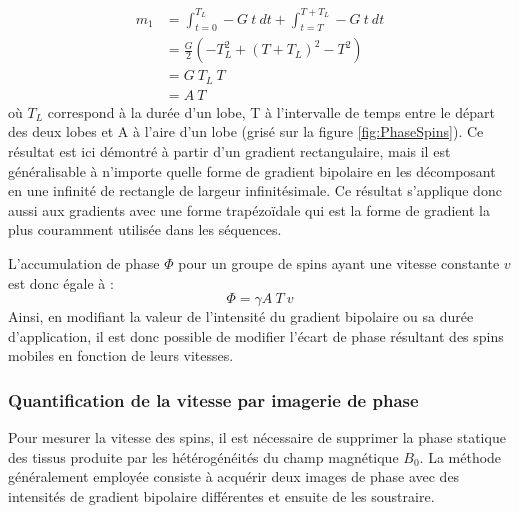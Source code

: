 	\begin{equation}
	\begin{split}
	m_1 &= \int_{t=0}^{T_L} -G \ t \ dt  + \int_{t=T}^{T+T_L} -G \ t \ dt  \\
			&= \frac{G}{2}\left(-T_L^2+(T+T_L)^2-T^2\right) \\
			&=G \ T_L \ T \\
			& = A \ T
	\end{split} 
	\end{equation}	
où $T_L$ correspond à la durée d'un lobe, T à l'intervalle de temps entre le départ des deux lobes et A à l'aire d'un lobe (grisé sur la figure \ref{fig:PhaseSpins}). Ce résultat est ici démontré à partir d'un gradient rectangulaire, mais il est généralisable à n'importe quelle forme de gradient bipolaire en les décomposant en une infinité de rectangle de largeur infinitésimale. Ce résultat s'applique donc aussi aux gradients avec une forme trapézoïdale qui est la forme de gradient la plus couramment utilisée dans les séquences.

L'accumulation de phase $\Phi$ pour un groupe de spins ayant une vitesse constante $v$ est donc égale à :
\begin{equation}
\label{eq:VitessePhase}
\Phi = \gamma A \ T \ v
\end{equation}
Ainsi, en modifiant la valeur de l'intensité du gradient bipolaire ou sa durée d'application, il est donc possible de modifier l'écart de phase résultant des spins mobiles en fonction de leurs vitesses.

\subsubsection{Quantification de la vitesse par imagerie de phase}

Pour mesurer la vitesse des spins, il est nécessaire de supprimer la phase statique des tissus produite par les hétérogénéités du champ magnétique $B_0$. La méthode généralement employée consiste à acquérir deux images de phase avec des intensités de gradient bipolaire différentes et ensuite de les soustraire.

